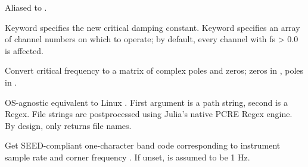 \documentclass[letterpaper,11pt,english]{sphinxmanual}
\begin{document}
\begin{fulllineitems}
\label{\detokenize{src/Appendices/function_list:d2u}}
\end{fulllineitems}


Aliased to .

Keyword  specifies the new critical damping constant. Keyword  specifies an array of channel numbers on which to operate; by default, every channel with fs \textgreater{} 0.0 is affected.

\begin{fulllineitems}
\label{\detokenize{src/Appendices/function_list:fctopz}}
\end{fulllineitems}


Convert critical frequency  to a matrix of complex poles and zeros; zeros in , poles in .

\begin{fulllineitems}
\label{\detokenize{src/Appendices/function_list:find_regex}}
\end{fulllineitems}


OS-agnostic equivalent to Linux . First argument is a path string, second is a Regex. File strings are postprocessed using Julia’s native PCRE Regex engine. By design,  only returns file names.

\begin{fulllineitems}
\label{\detokenize{src/Appendices/function_list:getbandcode}}
\end{fulllineitems}


Get SEED-compliant one-character band code corresponding to instrument sample rate  and corner frequency . If unset,  is assumed to be 1 Hz.
\end{document}
